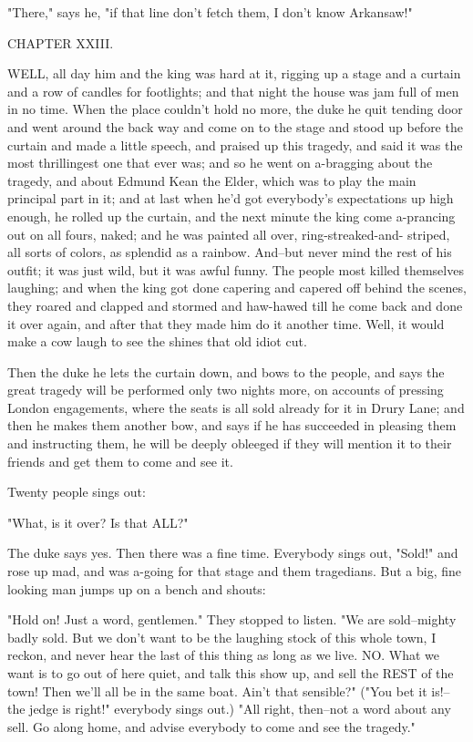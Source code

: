 "There," says he, "if that line don't fetch them, I don't know Arkansaw!"




CHAPTER XXIII.

WELL, all day him and the king was hard at it, rigging up a stage and a
curtain and a row of candles for footlights; and that night the house was
jam full of men in no time.  When the place couldn't hold no more, the
duke he quit tending door and went around the back way and come on to the
stage and stood up before the curtain and made a little speech, and
praised up this tragedy, and said it was the most thrillingest one that
ever was; and so he went on a-bragging about the tragedy, and about
Edmund Kean the Elder, which was to play the main principal part in it;
and at last when he'd got everybody's expectations up high enough, he
rolled up the curtain, and the next minute the king come a-prancing out
on all fours, naked; and he was painted all over, ring-streaked-and-
striped, all sorts of colors, as splendid as a rainbow.  And--but never
mind the rest of his outfit; it was just wild, but it was awful funny.
The people most killed themselves laughing; and when the king got done
capering and capered off behind the scenes, they roared and clapped and
stormed and haw-hawed till he come back and done it over again, and after
that they made him do it another time. Well, it would make a cow laugh to
see the shines that old idiot cut.

Then the duke he lets the curtain down, and bows to the people, and says
the great tragedy will be performed only two nights more, on accounts of
pressing London engagements, where the seats is all sold already for it
in Drury Lane; and then he makes them another bow, and says if he has
succeeded in pleasing them and instructing them, he will be deeply
obleeged if they will mention it to their friends and get them to come
and see it.

Twenty people sings out:

"What, is it over?  Is that ALL?"

The duke says yes.  Then there was a fine time.  Everybody sings out,
"Sold!" and rose up mad, and was a-going for that stage and them
tragedians.  But a big, fine looking man jumps up on a bench and shouts:

"Hold on!  Just a word, gentlemen."  They stopped to listen.  "We are
sold--mighty badly sold.  But we don't want to be the laughing stock of
this whole town, I reckon, and never hear the last of this thing as long
as we live.  NO.  What we want is to go out of here quiet, and talk this
show up, and sell the REST of the town!  Then we'll all be in the same
boat.  Ain't that sensible?" ("You bet it is!--the jedge is right!"
everybody sings out.) "All right, then--not a word about any sell.  Go
along home, and advise everybody to come and see the tragedy."

